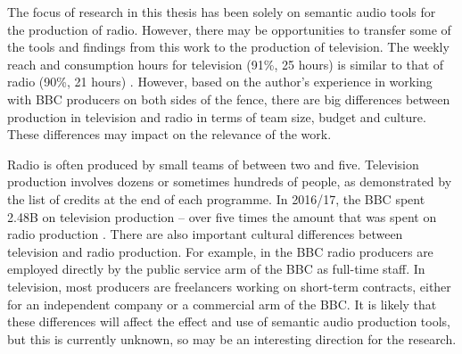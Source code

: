 The focus of research in this thesis has been solely on semantic audio tools for the production of radio. However,
there may be opportunities to transfer some of the tools and findings from this work to the production of television.
The weekly reach and consumption hours for television (91\%, 25 hours) is similar to that of radio (90\%, 21 hours)
\citep[pp.  82, 119]{Ofcom2017}.  However, based on the author's experience in working with BBC producers on both sides
of the fence, there are big differences between production in television and radio in terms of team size, budget and
culture. These differences may impact on the relevance of the work.

Radio is often produced by small teams of between two and five. Television production involves dozens or sometimes
hundreds of people, as demonstrated by the list of credits at the end of each programme.  In 2016/17, the BBC spent
\textsterling2.48B on television production -- over five times the amount that was spent on radio production \citep[pp.
39, 111]{Ofcom2017}. There are also important cultural differences between television and radio production. For
example, in the BBC radio producers are employed directly by the public service arm of the BBC as full-time staff. In
television, most producers are freelancers working on short-term contracts, either for an independent company or a
commercial arm of the BBC. It is likely that these differences will affect the effect and use of semantic audio
production tools, but this is currently unknown, so may be an interesting direction for the research.





